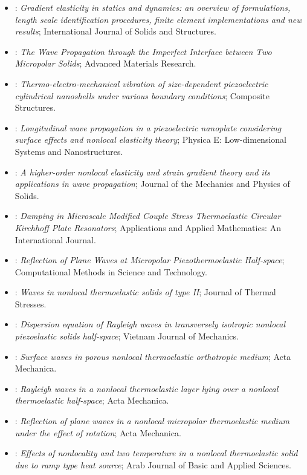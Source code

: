 \begin{itemize}
\item \citet{Askes2011}: \emph{Gradient elasticity in statics and dynamics: an overview of formulations, length scale identification procedures, finite element implementations and new results}; International Journal of Solids and Structures.
\item \citet{Fu2013}: \emph{The Wave Propagation through the Imperfect Interface between Two Micropolar Solids}; Advanced Materials Research.
\item \citet{Ke2014}: \emph{Thermo-electro-mechanical vibration of size-dependent piezoelectric cylindrical nanoshells under various boundary conditions}; Composite Structures.
\item \citet{Zang2014}: \emph{Longitudinal wave propagation in a piezoelectric nanoplate considering surface effects and nonlocal elasticity theory}; Physica E: Low-dimensional Systems and Nanostructures.
\item \citet{Lim2015}: \emph{A higher-order nonlocal elasticity and strain gradient theory and its applications in wave propagation}; Journal of the Mechanics and Physics of Solids.
\item \citet{Kumar2017}: \emph{Damping in Microscale Modified Couple Stress Thermoelastic Circular Kirchhoff Plate Resonators}; Applications and Applied Mathematics: An International Journal.
\item \citet{Kumar2018}: \emph{Reflection of Plane Waves at Micropolar Piezothermoelastic Half-space}; Computational Methods in Science and Technology.
\item \citet{Sarkar2019}: \emph{Waves in nonlocal thermoelastic solids of type II}; Journal of Thermal Stresses.
\item \citet{Tung2019}: \emph{Dispersion equation of Rayleigh waves in transversely isotropic nonlocal piezoelastic solids half-space}; Vietnam Journal of Mechanics.
\item \citet{Biswas2020a}: \emph{Surface waves in porous nonlocal thermoelastic orthotropic medium}; Acta Mechanica.
\item \citet{Biswas2020b}: \emph{Rayleigh waves in a nonlocal thermoelastic layer lying over a nonlocal thermoelastic half-space}; Acta Mechanica.
\item \citet{Kalkal2020}: \emph{Reflection of plane waves in a nonlocal micropolar thermoelastic medium under the effect of rotation}; Acta Mechanica.
\item \citet{Lata2020}: \emph{Effects of nonlocality and two temperature in a nonlocal thermoelastic solid due to ramp type heat source}; Arab Journal of Basic and Applied Sciences.

\end{itemize}

